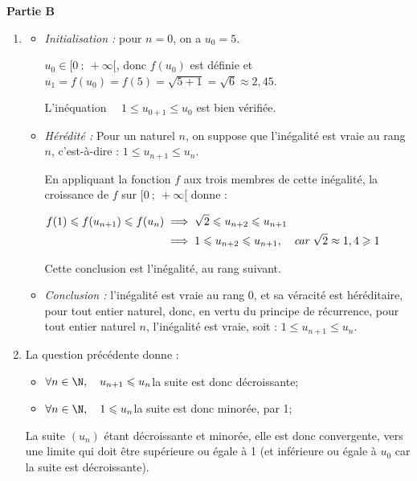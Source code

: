 \medskip
\textbf{Partie B}

\medskip

\begin{enumerate}
	\item \begin{itemize}
		\item \emph{Initialisation :} pour  $n= 0$, on a $u_0 = 5$.

$u_0 \in [0~;~+\infty[$, donc $f(u_0)$ est définie et $u_1 = f(u_0) = f(5) = \sqrt{5+1} = \sqrt{6} \approx 2,45$.

L'inéquation $ \quad 1 \leqslant u_{0+1} \leqslant u_0$ \quad est bien vérifiée.

		\item \emph{Hérédité :} Pour un naturel $n$, on suppose que l'inégalité est vraie au rang $n$, c'est-à-dire : \quad $1 \leqslant u_{n+1} \leqslant u_n$.

En appliquant la fonction $f$ aux trois membres de cette inégalité, la croissance de $f$ sur $[0~;~+\infty[$ donne :

$\begin{aligned} f(1 ) \leqslant f(u_{n+1})\leqslant f(u_n) &\implies \sqrt{2} \leqslant u_{n+2} \leqslant u_{n+1}\\
&\implies 1 \leqslant u_{n+2} \leqslant u_{n+1},\quad \emph{car } \sqrt{2} \approx 1,4 \geqslant 1\end{aligned}$

Cette conclusion est l'inégalité, au rang suivant.

	\item \emph{Conclusion :} l'inégalité est vraie au rang 0, et sa véracité est héréditaire, pour tout entier naturel, donc, en vertu du principe de récurrence, pour tout entier naturel $n$, l'inégalité est vraie, soit : \quad $1 \leqslant u_{n+1} \leqslant u_{n}$.
		\end{itemize}

	\item La question précédente donne :
\begin{itemize}[left=5mm]
		\item $\forall n\in \N, \quad u_{n+1} \leqslant u_n$\quad la suite est donc décroissante;
		\item $\forall n\in \N, \quad 1 \leqslant u_n$\quad la suite est donc minorée, par 1;
	\end{itemize}

La suite $\left(u_n\right)$ étant décroissante et minorée, elle est donc convergente, vers une limite qui doit être supérieure ou égale à 1 (et inférieure ou égale à $u_0$ car la suite est décroissante).


\end{enumerate}
